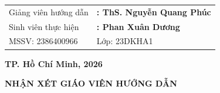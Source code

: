 \documentclass[13pt,a4paper]{report}
\begin{document}
\begin{titlepage}
		\vspace{2.1cm}
		
		\begin{center}
			{\large
				\begin{tabular}{p{4.8cm} p{7.8cm}}
					{ Giảng viên hướng dẫn} & {\bfseries : ThS. Nguyễn Quang Phúc} \\[0.4cm]
					{ Sinh viên thực hiện} & {\bfseries : Phan Xuân Dương} \\[0.4cm]
					{MSSV:} 2386400966 & { Lớp:} 23DKHA1 \\
				\end{tabular}
			}
		\end{center}
		
		
		
		\vspace{2.7cm}
		
		\begin{center}
			{\large \bfseries TP. Hồ Chí Minh, 2026}
		\end{center}
		
	\end{titlepage}
	
\fontsize{14pt}{20pt}\selectfont
\setlength{\parindent}{1.5cm}
\setlength{\parskip}{0.2cm}


\newpage
\thispagestyle{empty}

\begin{center}
	{\LARGE \bfseries NHẬN XÉT GIÁO VIÊN HƯỚNG DẪN}
\end{center}

\vspace{2cm}

{\large
	\noindent
	\makebox[\textwidth]{\dotfill}\\[0.45cm]
	\makebox[\textwidth]{\dotfill}\\[0.45cm]
	\makebox[\textwidth]{\dotfill}\\[0.45cm]
	\makebox[\textwidth]{\dotfill}\\[0.45cm]
	\makebox[\textwidth]{\dotfill}\\[0.45cm]
	\makebox[\textwidth]{\dotfill}\\[0.45cm]
	\makebox[\textwidth]{\dotfill}\\[0.45cm]
	\makebox[\textwidth]{\dotfill}\\[0.45cm]
	\makebox[\textwidth]{\dotfill}\\[0.45cm]
	\makebox[\textwidth]{\dotfill}\\[0.45cm]
	\makebox[\textwidth]{\dotfill}\\[0.45cm]
	\makebox[\textwidth]{\dotfill}\\[0.45cm]
	\makebox[\textwidth]{\dotfill}\\[0.45cm]
	\makebox[\textwidth]{\dotfill}
}
\end{document}
